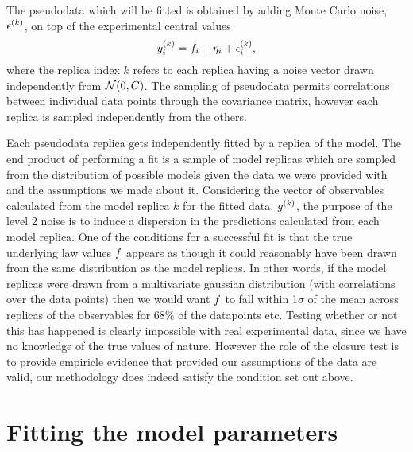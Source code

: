 The pseudodata which will be fitted is obtained by adding Monte Carlo
noise, $\epsilon^{(k)}$, on top of the experimental central values
\begin{equation}\label{eq:leveltwodata1}
    y^{(k)}_{i} = f_i + \eta_i + \epsilon^{(k)}_{i},
\end{equation}
where the replica index $k$ refers to each replica having a noise vector drawn
independently from $\mathcal{N}(0, C)$. The sampling of pseudodata permits
correlations between individual data points through the covariance matrix,
however each replica is sampled independently from the others.

Each pseudodata replica gets independently fitted by a replica of the model.
The end product of performing a fit is a sample of model replicas which are
sampled from the distribution of possible models given the data we were provided
with and the assumptions we made about it. Considering the vector of observables
calculated from the model replica $k$
for the fitted data, $g^{(k)}$, the purpose of the level 2 noise
is to induce a dispersion in the predictions calculated from each model replica.
One of the conditions for a successful fit is that the true underlying law
values $f$ appears as though it could reasonably have been drawn from the
same distribution as the model replicas. In other words, if the model replicas
were drawn from a multivariate gaussian distribution (with correlations over
the data points) then we would want $f$ to fall within 1$\sigma$ of the mean
across replicas of the observables for 68\% of the datapoints etc. Testing
whether or not this has happened is clearly impossible with real experimental
data, since we have no knowledge of the true values of nature. However the role
of the closure test is to provide empiricle evidence that provided our assumptions
of the data are valid, our methodology does indeed satisfy the condition set out
above.

\section{Fitting the model parameters}

